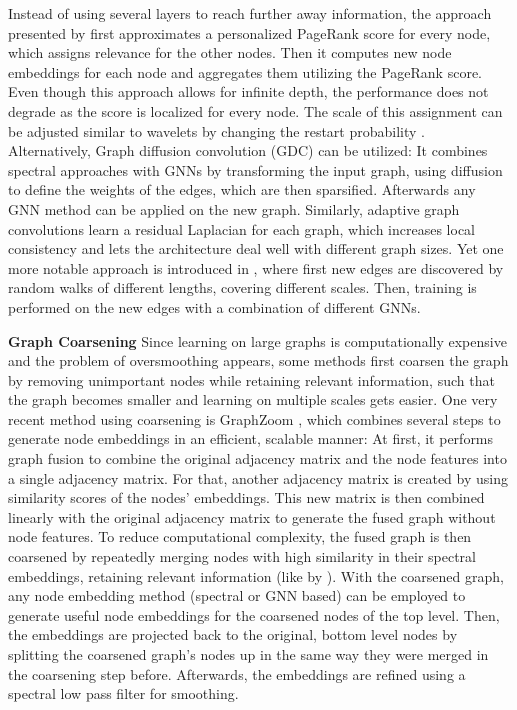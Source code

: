 \documentclass{article}
\begin{document}
Instead of using several layers to reach further away information, the approach presented by  \citet{klicpera_predict_2019} first approximates a personalized PageRank score for every node, which assigns relevance for the other nodes.  
Then it computes new node embeddings for each node and aggregates them utilizing the PageRank score. Even though this approach allows for infinite depth, the performance does not degrade as the score is localized for every node. The scale of this assignment can be adjusted similar to wavelets by changing the restart probability \cite{page1999pagerank}.
 Alternatively, Graph diffusion convolution (GDC) \cite{ klicpera2019diffusion} can be utilized: It combines spectral approaches with GNNs by transforming the input graph, using diffusion to define the weights of the edges, which are then sparsified. Afterwards any GNN method can be applied on the new graph. Similarly, adaptive graph convolutions \cite{li2018adaptive} learn a residual Laplacian for each graph, which increases local consistency and lets the architecture deal well with different graph sizes.
Yet one more notable approach is introduced in \citet{abu2018n}, where first new edges are discovered by random walks of different lengths, covering different scales. Then, training is performed on the new edges with a combination of different GNNs.


\textbf{Graph Coarsening} 
Since learning on large graphs is computationally expensive and the problem of oversmoothing appears, some methods first coarsen the graph by removing unimportant nodes while retaining relevant information, such that the graph becomes smaller and learning on multiple scales gets easier.
One very recent method using coarsening is GraphZoom \cite{deng2020graphzoom}, which combines several steps to generate node embeddings in an efficient, scalable manner: At first, it performs graph fusion to combine the original adjacency matrix and the node features into a single adjacency matrix. For that, another adjacency matrix is created by using similarity scores of the nodes' embeddings. This new matrix is then combined linearly with the original adjacency matrix to generate the fused graph without node features. To reduce computational complexity, the fused graph is then coarsened by repeatedly merging nodes with high similarity in their spectral embeddings, retaining relevant information (like by \citet{Shuman_2013}). With the coarsened graph, any node embedding method (spectral or GNN based) can be employed to generate useful node embeddings for the coarsened nodes of the top level. Then, the embeddings are projected back to the original, bottom level nodes by splitting the coarsened graph's nodes up in the same way they were merged in the coarsening step before. Afterwards, the embeddings are refined using a spectral low pass filter for smoothing.%
\end{document}
